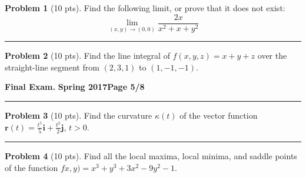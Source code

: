 \documentclass[12pt]{article}
\theoremstyle{definition}
\newtheorem{problem}{Problem}
\begin{document}
\bigskip
\begin{problem}[10 pts]
Find the following limit, or prove that it does not exist:
\begin{equation*}
\lim_{(x,y)\to(0,0)} \frac{2x}{x^2+x+y^2}
\end{equation*}
\vspace{8.5cm}
\begin{flushright}
\end{flushright}
\end{problem}
\hrule
\begin{problem}[10 pts]
Find the line integral of $f(x,y,z)=x+y+z$ over the straight-line segment from $(2,3,1)$ to $(1,-1,-1)$.
\vspace{8cm}
\begin{flushright}
\end{flushright}
\end{problem}
\newpage

\hfill{\large\bf Final Exam.}\hfill{\large\bf
  Spring 2017}\hfill{\large\bf Page 5/8}\hrule

\bigskip
\begin{problem}[10 pts]
Find the curvature $\kappa(t)$ of the vector function $\boldsymbol{r}(t) = \frac{t^5}{5}\boldsymbol{i} + \frac{t^2}{2}\boldsymbol{j}$, $t>0$.
\vspace{5cm}
\begin{flushright}
\end{flushright}
\end{problem}
\hrule
\begin{problem}[10 pts]
Find all the local maxima, local minima, and saddle points of the function $fx,y) = x^3+y^3+3x^2-9y^2-1$.
\end{problem}

\newpage
\end{document}
